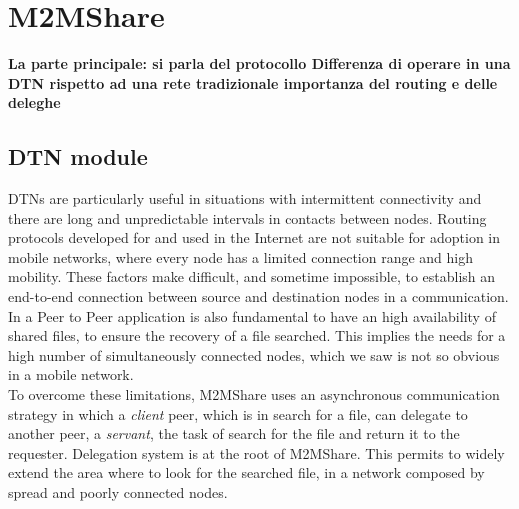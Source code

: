 
\chapter{M2MShare}\label{m2mshare} %





\textbf{La parte principale: si parla del protocollo
Differenza di operare in una DTN rispetto ad una rete tradizionale
importanza del routing e delle deleghe}
\\


\section{DTN module}
DTNs are particularly useful in situations with intermittent connectivity and there are long and unpredictable intervals in contacts between nodes. Routing protocols developed for and used in the Internet are not suitable for adoption in mobile networks, where every node has a limited connection range and high mobility. These factors make difficult, and sometime impossible, to establish an end-to-end connection between source and destination nodes in a communication.
\\

In a Peer to Peer application is also fundamental to have an high availability of shared files, to ensure the recovery of a file searched. This implies the needs for a high number of simultaneously connected nodes, which we saw is not so obvious in a mobile network.
\\

To overcome these limitations, M2MShare uses an asynchronous communication strategy in which a \textit{client} peer, which is in search for a file, can delegate to another peer, a \textit{servant}, the task of search for the file and return it to the requester. Delegation system is at the root of M2MShare. This permits to widely extend the area where to look for the searched file, in a network composed by spread and poorly connected nodes.
\\

